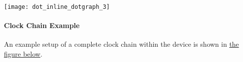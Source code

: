 \label{group__asfdoc__sam0__system__clock__group_asfdoc_sam0_system_clock_module_chain_overview}%
\hypertarget{group__asfdoc__sam0__system__clock__group_asfdoc_sam0_system_clock_module_chain_overview}{}%
\begin{center}

\begin{DoxyImageNoCaption}
  \mbox{\texttt{[image: dot\_inline\_dotgraph\_3]}}
\end{DoxyImageNoCaption}
\end{center}
\hypertarget{group__asfdoc__sam0__system__clock__group_asfdoc_sam0_system_clock_module_chain_example}{}\paragraph{Clock Chain Example}\label{group__asfdoc__sam0__system__clock__group_asfdoc_sam0_system_clock_module_chain_example}
An example setup of a complete clock chain within the device is shown in \hyperlink{group__asfdoc__sam0__system__clock__group_asfdoc_sam0_system_clock_module_chain_example_fig}{the figure below}.

